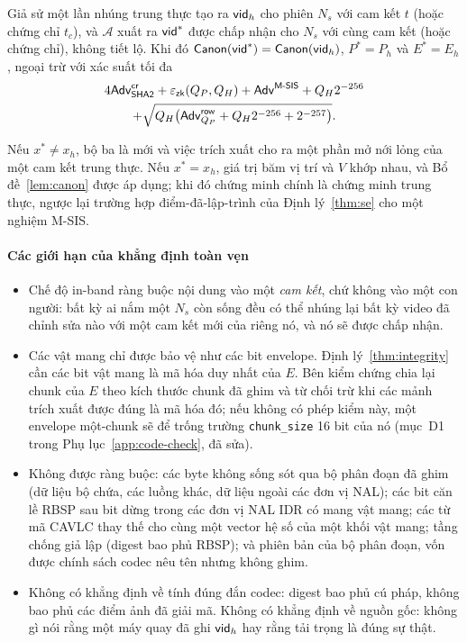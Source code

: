 \begin{theorem}
\label{thm:integrity}
Giả sử một lần nhúng trung thực tạo ra $\mathsf{vid}_h$ cho phiên $N_s$ với cam kết $t$
(hoặc chứng chỉ $t_c$), và $\mathcal A$ xuất ra $\mathsf{vid}^*$ được chấp nhận cho
$N_s$ với cùng cam kết (hoặc chứng chỉ), không tiết lộ. Khi đó
$\mathsf{Canon}(\mathsf{vid}^*)=\mathsf{Canon}(\mathsf{vid}_h)$, $P^*=P_h$ và $E^*=E_h$, ngoại trừ với xác suất
tối đa
\begin{multline*}
4\mathsf{Adv}^{\mathsf{cr}}_{\mathsf{SHA2}}+\varepsilon_{\mathsf{zk}}(Q_P,Q_H)+\mathsf{Adv}^{\textsf{M-SIS}}+Q_H2^{-256}\\
+\sqrt{Q_H\bigl(\mathsf{Adv}^{\mathsf{row}}_{Q_P}+Q_H2^{-256}+2^{-257}\bigr)}.
\end{multline*}
\end{theorem}
\noindent
Nếu $x^*\neq x_h$, bộ ba là mới và việc trích xuất cho ra một phần mở nới lỏng
của một cam kết trung thực. Nếu $x^*=x_h$, giá trị băm vị trí và $V$ khớp nhau,
và Bổ đề~\ref{lem:canon} được áp dụng; khi đó chứng minh chính là chứng minh
trung thực, ngược lại trường hợp điểm-đã-lập-trình của Định lý~\ref{thm:se} cho
một nghiệm M-SIS.

\paragraph{Các giới hạn của khẳng định toàn vẹn}
\begin{itemize}
\item Chế độ in-band ràng buộc nội dung vào một \emph{cam kết}, chứ không vào
  một con người: bất kỳ ai nắm một $N_s$ còn sống đều có thể nhúng lại bất kỳ
  video đã chỉnh sửa nào với một cam kết mới của riêng nó, và nó sẽ được chấp
  nhận.
\item Các vật mang chỉ được bảo vệ như các bit envelope. Định lý~\ref{thm:integrity}
  cần các bit vật mang là mã hóa duy nhất của $E$. Bên kiểm chứng chia lại chunk
  của $E$ theo kích thước chunk đã ghim và từ chối trừ khi các mảnh trích xuất
  được đúng là mã hóa đó; nếu không có phép kiểm này, một envelope một-chunk sẽ
  để trống trường \texttt{chunk\_size} 16 bit của nó (mục~D1 trong
  Phụ lục~\ref{app:code-check}, đã sửa).
\item Không được ràng buộc: các byte không sống sót qua bộ phân đoạn đã ghim (dữ
  liệu bộ chứa, các luồng khác, dữ liệu ngoài các đơn vị NAL); các bit căn lề
  RBSP sau bit dừng trong các đơn vị NAL IDR có mang vật mang; các từ mã CAVLC
  thay thế cho cùng một vector hệ số của một khối vật mang; tầng chống giả lập
  (digest bao phủ RBSP); và phiên bản của bộ phân đoạn, vốn được chính sách
  codec nêu tên nhưng không ghim.
\item Không có khẳng định về tính đúng đắn codec: digest bao phủ cú pháp, không
  bao phủ các điểm ảnh đã giải mã. Không có khẳng định về nguồn gốc: không gì
  nói rằng một máy quay đã ghi $\mathsf{vid}_h$ hay rằng tải trọng là đúng sự thật.
\end{itemize}

